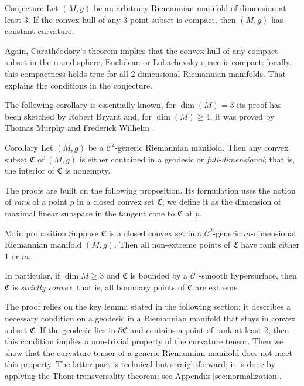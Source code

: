 \documentclass[a4paper,10pt]{article}
\begin{document}
\begin{thm}{Conjecture}  Let $(M,g)$ be an arbitrary Riemannian manifold of dimension at least 3.
If the convex hull of any 3-point subset is compact,
then $(M,g)$ has constant curvature.
\end{thm}

Again, Carathéodory's  theorem implies that the convex hull of any  compact subset in the round sphere, Euclidean or Lobachevsky space  is compact; locally, this compactness holds true for all 2-dimensional Riemannian manifolds.
That explains the conditions in the conjecture.

The following corollary is essentially known, for $\dim (M)=3$ its proof has been sketched by Robert Bryant \cite{Bryant} and, for $\dim (M)\geq 4$, it was proved by Thomas Murphy and Frederick Wilhelm \cite{Wilhelm}.

\begin{thm}{Corollary}\label{cor:main}
Let $(M,g)$ be a $\mathcal C^2$-generic Riemannian manifold.
Then any convex subset $\mathfrak C$ of $(M,g)$ is either contained in a geodesic
or \emph{full-dimensional}; that is, the interior of $\mathfrak C$ is nonempty.
\end{thm}

The proofs are built on the following proposition.
Its formulation uses the notion of \emph{rank} of a point $p$ in a closed convex set $\mathfrak{C}$;
we define it as the dimension of maximal linear subspace in the tangent cone to $\mathfrak{C}$ at $p$.

\begin{thm}{Main proposition}\label{prom:rank}
Suppose $\mathfrak{C}$ is a closed convex set in a $\mathcal C^2$-generic $m$-dimensional Riemannian manifold $(M,g)$.
Then all non-extreme points of $\mathfrak{C}$ have rank either $1$ or $m$.

In particular, if $\dim M\ge 3$ and $\mathfrak{C}$ is bounded by a $\mathcal{C}^1$-smooth hypersurface, then $\mathfrak{C}$ is \emph{strictly convex};
that is, all boundary points of $\mathfrak{C}$ are extreme.
\end{thm}


The proof relies on the key lemma stated in the following section;   
it describes a necessary condition on a geodesic in a Riemannian manifold that stays
in convex subset $\mathfrak C$.
If the geodesic  lies in $\partial \mathfrak C$ and  contains a point of rank at least 2, then this condition implies a non-trivial
property  of the curvature tensor.
Then we show that the curvature tensor of a generic Riemannian manifold does not meet this property.
The latter part is technical but straightforward; it is done by applying the Thom transversality theorem; see Appendix \ref{sec:normalization}.
\end{document}
